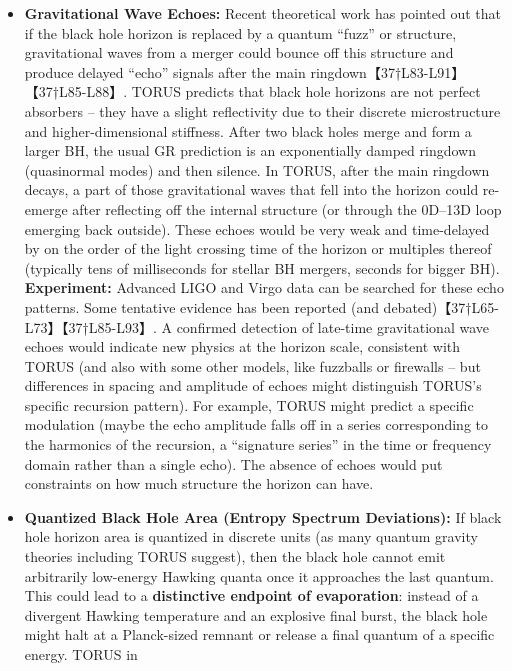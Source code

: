 \documentclass[]{article}
\begin{document}
\begin{itemize}
\item
  \textbf{Gravitational Wave Echoes:} Recent theoretical work has
  pointed out that if the black hole horizon is replaced by a quantum
  ``fuzz'' or structure, gravitational waves from a merger could bounce
  off this structure and produce delayed ``echo'' signals after the main
  ringdown【37†L83-L91】【37†L85-L88】. TORUS predicts that black hole
  horizons are not perfect absorbers -- they have a slight reflectivity
  due to their discrete microstructure and higher-dimensional stiffness.
  After two black holes merge and form a larger BH, the usual GR
  prediction is an exponentially damped ringdown (quasinormal modes) and
  then silence. In TORUS, after the main ringdown decays, a part of
  those gravitational waves that fell into the horizon could re-emerge
  after reflecting off the internal structure (or through the 0D--13D
  loop emerging back outside). These echoes would be very weak and
  time-delayed by on the order of the light crossing time of the horizon
  or multiples thereof (typically tens of milliseconds for stellar BH
  mergers, seconds for bigger BH). \textbf{Experiment:} Advanced LIGO
  and Virgo data can be searched for these echo patterns. Some tentative
  evidence has been reported (and debated)【37†L65-L73】【37†L85-L93】.
  A confirmed detection of late-time gravitational wave echoes would
  indicate new physics at the horizon scale, consistent with TORUS (and
  also with some other models, like fuzzballs or firewalls -- but
  differences in spacing and amplitude of echoes might distinguish
  TORUS's specific recursion pattern). For example, TORUS might predict
  a specific modulation (maybe the echo amplitude falls off in a series
  corresponding to the harmonics of the recursion, a ``signature
  series'' in the time or frequency domain rather than a single echo).
  The absence of echoes would put constraints on how much structure the
  horizon can have.
\item
  \textbf{Quantized Black Hole Area (Entropy Spectrum Deviations):} If
  black hole horizon area is quantized in discrete units (as many
  quantum gravity theories including TORUS suggest), then the black hole
  cannot emit arbitrarily low-energy Hawking quanta once it approaches
  the last quantum. This could lead to a \textbf{distinctive endpoint of
  evaporation}: instead of a divergent Hawking temperature and an
  explosive final burst, the black hole might halt at a Planck-sized
  remnant or release a final quantum of a specific energy. TORUS in

\end{itemize}
\end{document}
